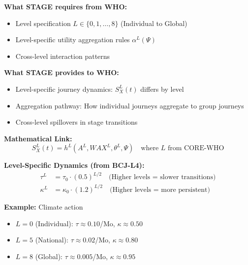 \begin{tcolorbox}[colback=blue!5!white, colframe=blue!75!black,
    title=Integration: STAGE $\leftrightarrow$ WHO]

\textbf{What STAGE requires from WHO:}
\begin{itemize}[nosep]
\item Level specification $L \in \{0, 1, \ldots, 8\}$ (Individual to Global)
\item Level-specific utility aggregation rules $\alpha^L(\Psi)$
\item Cross-level interaction patterns
\end{itemize}

\textbf{What STAGE provides to WHO:}
\begin{itemize}[nosep]
\item Level-specific journey dynamics: $S^L_X(t)$ differs by level
\item Aggregation pathway: How individual journeys aggregate to group journeys
\item Cross-level spillovers in stage transitions
\end{itemize}

\textbf{Mathematical Link:}
\begin{equation}
S^L_X(t) = h^L(A^L, WAX^L, \theta^L, \Psi) \quad \text{where } L \text{ from CORE-WHO}
\end{equation}

\textbf{Level-Specific Dynamics (from BCJ-L4):}
\begin{align}
\tau^L &= \tau_0 \cdot (0.5)^{L/2} \quad \text{(Higher levels = slower transitions)} \\
\kappa^L &= \kappa_0 \cdot (1.2)^{L/2} \quad \text{(Higher levels = more persistent)}
\end{align}

\textbf{Example:} Climate action
\begin{itemize}[nosep]
\item $L=0$ (Individual): $\tau \approx 0.10$/Mo, $\kappa \approx 0.50$
\item $L=5$ (National): $\tau \approx 0.02$/Mo, $\kappa \approx 0.80$
\item $L=8$ (Global): $\tau \approx 0.005$/Mo, $\kappa \approx 0.95$
\end{itemize}
\end{tcolorbox}

